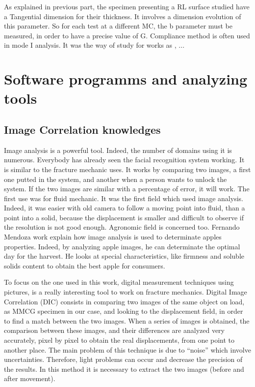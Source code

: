 As explained in previous part, the specimen presenting a RL surface studied have a Tangential dimension for their thickness. It involves a dimension evolution of this parameter. So for each test at a different MC, the b parameter must be measured, in order to have a precise value of G. Compliance method is often used in mode I analysis. It was the way of study for works as \parencite{Reference7}, \parencite{Ang2017}...

\section{Software programms and analyzing tools}

\subsection{Image Correlation knowledges}

Image analysis is a powerful tool. Indeed, the number of domains using it is numerous. Everybody has already seen the facial recognition system working. It is similar to the fracture mechanic uses. It works by comparing two images, a first one putted in the system, and another when a person wants to unlock the system. If the two images are similar with a percentage of error, it will work.
The first use was for fluid mechanic. It was the first field which used image analysis. Indeed, it was easier with old camera to follow a moving point into fluid, than a point into a solid, because the displacement is smaller and difficult to observe if the resolution is not good enough.
Agronomic field is concerned too. Fernando Mendoza work explain how image analysis is used to determinate apples properties. Indeed, by analyzing apple images, he can determinate the optimal day for the harvest. He looks at special characteristics, like firmness and soluble solids content to obtain the best apple for consumers.

To focus on the one used in this work, digital measurement techniques using pictures, is a really interesting tool to work on fracture mechanics. Digital Image Correlation (DIC) consists in comparing two images of the same object on load, as MMCG specimen in our case, and looking to the displacement field, in order to find a match between the two images. When a series of images is obtained, the comparison between these images, and their differences are analyzed very accurately, pixel by pixel to obtain the real displacements, from one point to another place. The main problem of this technique is due to “noise” which involve uncertainties. Therefore, light problems can occur and decrease the precision of the results. In this method it is necessary to extract the two images (before and after movement).

